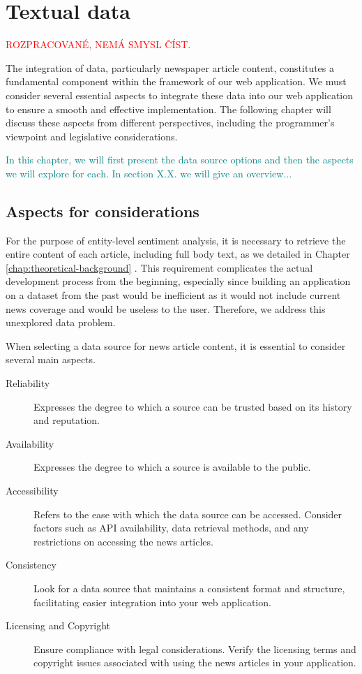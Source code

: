 \chapter{Textual data}
\label{chap:textual-data}

\textcolor{red}{ROZPRACOVANÉ, NEMÁ SMYSL ČÍST.}

The integration of data, particularly newspaper article content, constitutes a fundamental component within the framework of our web application. We must consider several essential aspects to integrate these data into our web application to ensure a smooth and effective implementation. The following chapter will discuss these aspects from different perspectives, including the programmer's viewpoint and legislative considerations. 

\textcolor{teal}{In this chapter, we will first present the data source options and then the aspects we will explore for each. In section X.X. we will give an overview...}

\section{Aspects for considerations}
For the purpose of entity-level sentiment analysis, it is necessary to retrieve the entire content of each article, including full body text, as we detailed in Chapter \ref{chap:theoretical-background} . This requirement complicates the actual development process from the beginning, especially since building an application on a dataset from the past would be inefficient as it would not include current news coverage and would be useless to the user. Therefore, we address this unexplored data problem.

When selecting a data source for news article content, it is essential to consider several main aspects.

\begin{description}
    \item[Reliability] Expresses the degree to which a source can be trusted based on its history and reputation.
    \item[Availability] Expresses the degree to which a source is available to the public.
    \item[Accessibility] Refers to the ease with which the data source can be accessed. Consider factors such as API availability, data retrieval methods, and any restrictions on accessing the news articles.
    \item[Consistency] Look for a data source that maintains a consistent format and structure, facilitating easier integration into your web application. 
    \item[Licensing and Copyright] Ensure compliance with legal considerations. Verify the licensing terms and copyright issues associated with using the news articles in your application.
\end{description}

